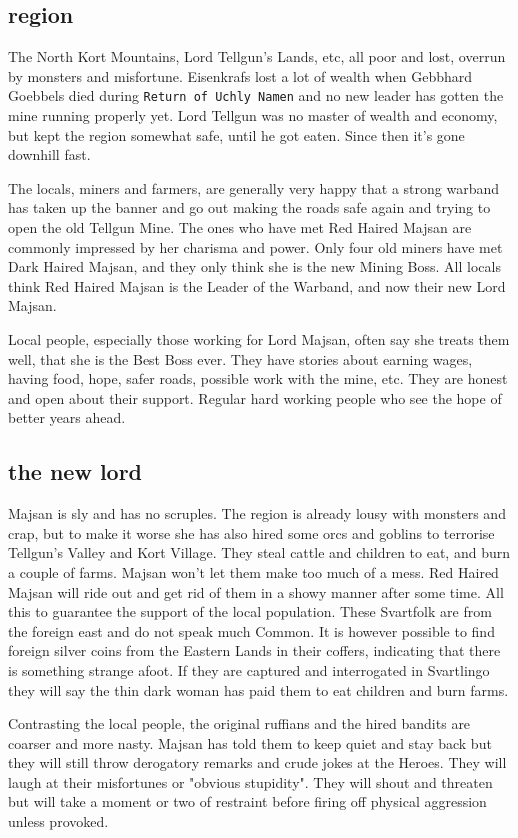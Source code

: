 \subsection*{region}
The North Kort Mountains, Lord Tellgun's Lands, etc, all poor and lost, overrun by monsters and misfortune. Eisenkrafs lost a lot of wealth when Gebbhard Goebbels died during \texttt{Return of Uchly Namen} and no new leader has gotten the mine running properly yet. Lord Tellgun was no master of wealth and economy, but kept the region somewhat safe, until he got eaten. Since then it's gone downhill fast.

The locals, miners and farmers, are generally very happy that a strong warband has taken up the banner and go out making the roads safe again and trying to open the old Tellgun Mine. The ones who have met Red Haired Majsan are commonly impressed by her charisma and power. Only four old miners have met Dark Haired Majsan, and they only think she is the new Mining Boss. All locals think Red Haired Majsan is the Leader of the Warband, and now their new Lord Majsan.

Local people, especially those working for Lord Majsan, often say she treats them well, that she is the Best Boss ever. They have stories about earning wages, having food, hope, safer roads, possible work with the mine, etc. They are honest and open about their support. Regular hard working people who see the hope of better years ahead.


\subsection*{the new lord}
Majsan is sly and has no scruples. The region is already lousy with monsters and crap, but to make it worse she has also hired some orcs and goblins to terrorise Tellgun's Valley and Kort Village. They steal cattle and children to eat, and burn a couple of farms. Majsan won't let them make too much of a mess. Red Haired Majsan will ride out and get rid of them in a showy manner after some time. All this to guarantee the support of the local population. These Svartfolk are from the foreign east and do not speak much Common. It is however possible to find foreign silver coins from the Eastern Lands in their coffers, indicating that there is something strange afoot. If they are captured and interrogated in Svartlingo they will say the thin dark woman has paid them to eat children and burn farms.

Contrasting the local people, the original ruffians and the hired bandits are coarser and more nasty. Majsan has told them to keep quiet and stay back but they will still throw derogatory remarks and crude jokes at the Heroes. They will laugh at their misfortunes or "obvious stupidity". They will shout and threaten but will take a moment or two of restraint before firing off physical aggression unless provoked.


